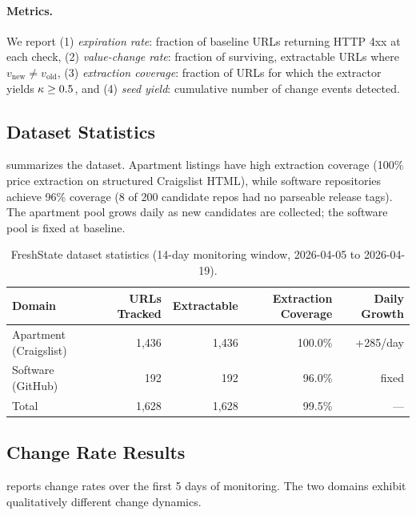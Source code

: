 \paragraph{Metrics.}
We report (1) \emph{expiration rate}: fraction of baseline URLs returning HTTP 4xx
at each check, (2) \emph{value-change rate}: fraction of surviving, extractable
URLs where $v_{\text{new}} \neq v_{\text{old}}$, (3) \emph{extraction coverage}:
fraction of URLs for which the extractor yields $\kappa \geq 0.5$, and
(4) \emph{seed yield}: cumulative number of change events detected.

\subsection{Dataset Statistics}

 summarizes the dataset. Apartment listings have high extraction
coverage (100\% price extraction on structured Craigslist HTML), while software
repositories achieve 96\% coverage (8 of 200 candidate repos had no parseable
release tags). The apartment pool grows daily as new candidates are collected;
the software pool is fixed at baseline.

\begin{table}[t]
  \centering
  \caption{FreshState dataset statistics (14-day monitoring window, 2026-04-05 to 2026-04-19).}
  \label{tab:dataset}
  \begin{tabular}{lrrrr}
    \toprule
    Domain & URLs Tracked & Extractable & Extraction Coverage & Daily Growth \\
    \midrule
    Apartment (Craigslist)  & 1,436 & 1,436 & 100.0\% & +285/day \\
    Software (GitHub)       &   192 &   192 &  96.0\% & fixed \\
    \midrule
    Total                   & 1,628 & 1,628 &  99.5\% & --- \\
    \bottomrule
  \end{tabular}
\end{table}

\subsection{Change Rate Results}

 reports change rates over the first 5 days of monitoring.
The two domains exhibit qualitatively different change dynamics.

